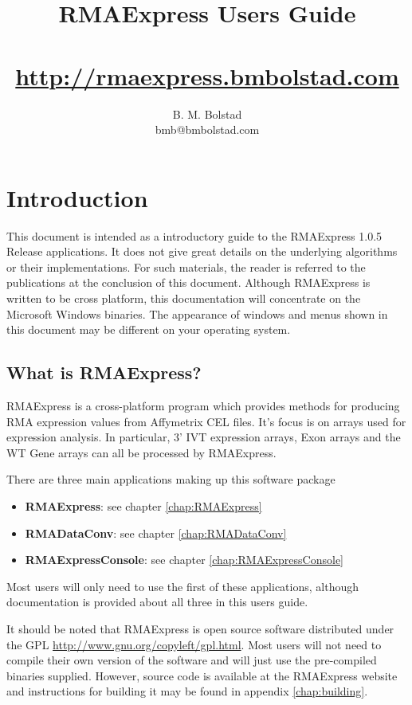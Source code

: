\documentclass[11pt]{report}
\title{RMAExpress Users Guide \\ {\small \curversion} \\ {\small \url{http://rmaexpress.bmbolstad.com}}}
\author{B. M. Bolstad \\ bmb@bmbolstad.com}
\newcommand{\curversion}{1.0.5 Release }
\begin{document}
\maketitle

\tableofcontents

\chapter{Introduction}

This document is intended as a introductory guide to the RMAExpress \curversion applications. It does not give great details on the underlying algorithms or their implementations. For such materials, the reader is referred to the publications at the conclusion of this document. Although RMAExpress is written to be cross platform, this documentation will concentrate on the Microsoft Windows binaries. The appearance of windows and menus shown in this document may be different on your operating system.

\section{What is RMAExpress?}

RMAExpress is a cross-platform program which provides methods for producing RMA expression values from Affymetrix CEL files. It's focus is on arrays used for expression analysis. In particular, 3' IVT expression arrays, Exon arrays and the WT Gene arrays can all be processed by RMAExpress.

There are three main applications making up this software package
\begin{itemize}
\item {\bf RMAExpress}: see chapter \ref{chap:RMAExpress}
\item {\bf RMADataConv}: see chapter \ref{chap:RMADataConv}
\item {\bf RMAExpressConsole}: see chapter \ref{chap:RMAExpressConsole}
\end{itemize}

Most users will only need to use the first of these applications, although documentation is provided about all three in this users guide. 

It should be noted that RMAExpress is open source software distributed under the GPL  \url{http://www.gnu.org/copyleft/gpl.html}. Most users will not need to compile their own version of the software and will just use the pre-compiled binaries supplied. However, source code is available at the RMAExpress website and instructions for building it may be found in appendix \ref{chap:building}.
\end{document}

